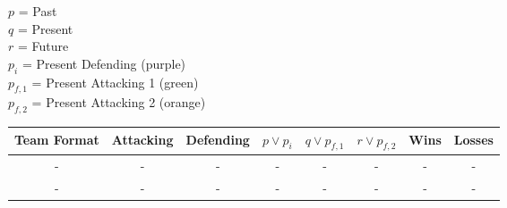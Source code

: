 \documentclass[11pt]{article}
\begin{document}
$p$ = Past \\
$q$ = Present \\
$r$ = Future \\

$p_i$ = Present Defending (purple) \\
$p_{f,1}$ = Present Attacking 1 (green) \\
$p_{f,2}$ = Present Attacking 2 (orange) \\

\begin{table}[h]
    \centering
    \begin{tabular} {|c|cc|ccc|cc|}
    \hline
    Team Format & Attacking & Defending & $p \vee p_i$ & $q \vee p_{f,1}$ & $r \vee p_{f,2}$ & Wins & Losses \\
    \hline
    - & - & - & - & - & - & - & - \\
    - & - & - & - & - & - & - & - \\
    \end{tabular}
\end{table}
\end{document}
